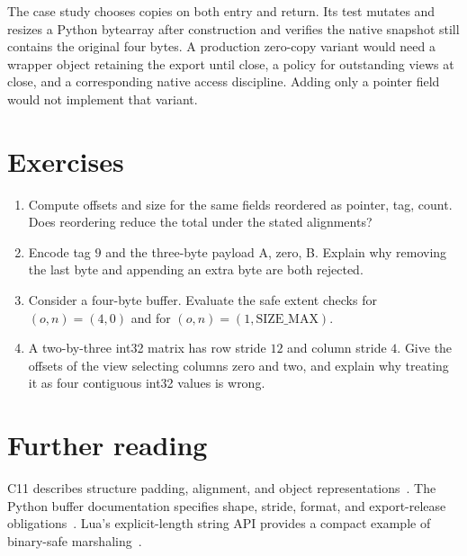 The case study chooses copies on both entry and return.
Its test mutates and resizes a Python bytearray after construction and verifies the native snapshot still contains the original four bytes.
A production zero-copy variant would need a wrapper object retaining the export until close, a policy for outstanding views at close, and a corresponding native access discipline.
Adding only a pointer field would not implement that variant.

\section{Exercises}
\label{sec:ch71-exercises}
\begin{enumerate}
\item\label{ex:ch71-layout} Compute offsets and size for the same fields reordered as pointer, tag, count.
Does reordering reduce the total under the stated alignments?
\item\label{ex:ch71-packet} Encode tag $9$ and the three-byte payload A, zero, B.
Explain why removing the last byte and appending an extra byte are both rejected.
\item\label{ex:ch71-overflow} Consider a four-byte buffer.
Evaluate the safe extent checks for $(o,n)=(4,0)$ and for $(o,n)=(1,\mathrm{SIZE\_MAX})$.
\item\label{ex:ch71-view} A two-by-three int32 matrix has row stride $12$ and column stride $4$.
Give the offsets of the view selecting columns zero and two, and explain why treating it as four contiguous int32 values is wrong.
\end{enumerate}

\section{Further reading}
\label{sec:ch71-reading}
C11 describes structure padding, alignment, and object representations~\cite{wg14-2011-c11}.
The Python buffer documentation specifies shape, stride, format, and export-release obligations~\cite{python-2026-capi}.
Lua's explicit-length string API provides a compact example of binary-safe marshaling~\cite{ierusalimschy-2026-lua}.
